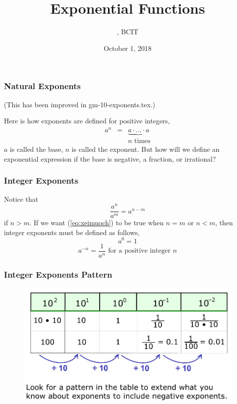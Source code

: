 \documentclass[xcolor=dvipsnames]{beamer}
\title{Exponential Functions}
\subtitle{{\CourseNumber}, BCIT}
\author{\CourseName}
\date{October 1, 2018}
\begin{document}
\begin{frame}
  \titlepage
\end{frame}

\begin{frame}
  \frametitle{Natural Exponents}
(This has been improved in gm-10-exponents.tex.)

Here is how exponents are defined for positive integers,
\begin{equation}
  \label{eq:ogheenoo}
  \begin{array}{rcl}
    a^{n}&=&\underbrace{a\cdot\ldots\cdot{}a} \\
         &&n\mbox{ times}
  \end{array}
\end{equation}
$a$ is called the \alert{base}, $n$ is called the \alert{exponent}.
But how will we define an exponential expression if the base is
negative, a fraction, or irrational?
\end{frame}

\begin{frame}
  \frametitle{Integer Exponents}
Notice that
\begin{equation}
  \label{eq:xeimuoch}
  \frac{a^{n}}{a^{m}}=a^{n-m}
\end{equation}
if $n>m$. If we want (\ref{eq:xeimuoch}) to be true when $n=m$ or
$n<m$, then integer exponents must be defined as follows,
\begin{equation}
  \label{eq:raishaep}
  a^{0}=1
\end{equation}
\begin{equation}
  \label{eq:pahcahka}
  a^{-n}=\frac{1}{a^{n}}\mbox{ for a positive integer }n
\end{equation}
\end{frame}

\begin{frame}
  \frametitle{Integer Exponents Pattern}
  \begin{figure}[h]
    \includegraphics[scale=.4]{./IntegerExponentsPattern.png}
  \end{figure}
\end{frame}
\end{document}
